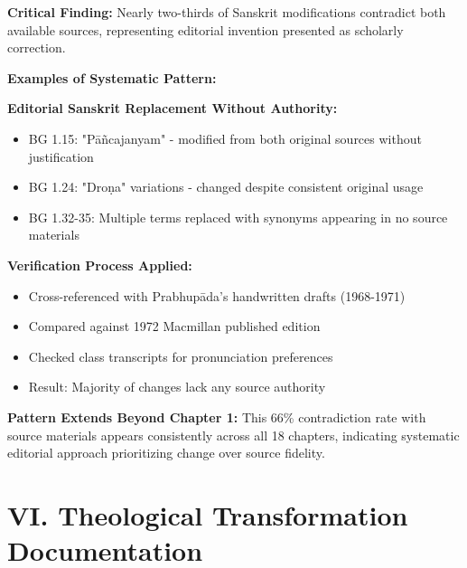\documentclass[11pt,twoside]{book}
\begin{document}
\textbf{\textbf{Critical Finding:}} Nearly two-thirds of Sanskrit modifications contradict both available sources, representing editorial invention presented as scholarly correction.

\textbf{\textbf{Examples of Systematic Pattern:}}

\textbf{\textbf{Editorial Sanskrit Replacement Without Authority:}}
\begin{itemize}
\item BG 1.15: "Pāñcajanyam" - modified from both original sources without justification
\item BG 1.24: "Droṇa" variations - changed despite consistent original usage
\item BG 1.32-35: Multiple terms replaced with synonyms appearing in no source materials
\end{itemize}

\textbf{\textbf{Verification Process Applied:}}
\begin{itemize}
\item Cross-referenced with Prabhupāda's handwritten drafts (1968-1971)
\item Compared against 1972 Macmillan published edition
\item Checked class transcripts for pronunciation preferences
\item Result: Majority of changes lack any source authority
\end{itemize}

\textbf{\textbf{Pattern Extends Beyond Chapter 1:}}
This 66\% contradiction rate with source materials appears consistently across all 18 chapters, indicating systematic editorial approach prioritizing change over source fidelity.
\section*{VI. Theological Transformation Documentation}
\label{sec:org02a34e4}
\end{document}
